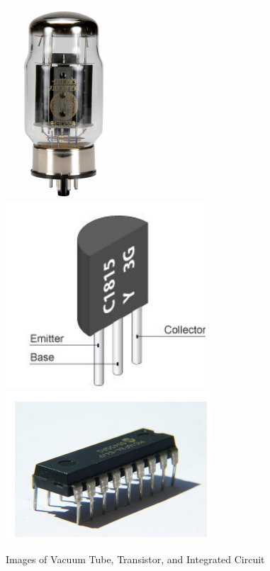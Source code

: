 \documentclass[9pt,twocolumn]{article}
\begin{document}
  \begin{figure}[h]
    \centering
    \includegraphics[scale=0.4]{./assets/001/vacuum-tube.png}
    \includegraphics[scale=0.4]{./assets/001/transistor.png}
    \includegraphics[scale=0.5]{./assets/001/integrated-circuit.png}
    \caption{Images of Vacuum Tube, Transistor, and Integrated Circuit}
  \end{figure}
  
\end{document}
